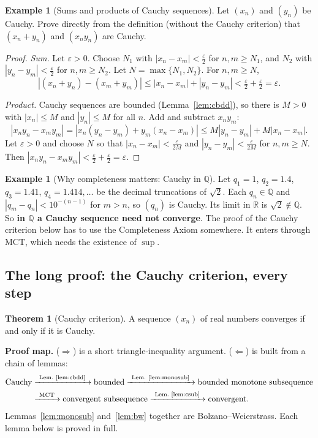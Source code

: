 \documentclass[11pt]{article}
\theoremstyle{definition}
\newtheorem{thm}[defn]{Theorem}
\newtheorem{ex}[defn]{Example}
\newcommand{\Q}{\mathbb{Q}}
\newcommand{\R}{\mathbb{R}}
\newcommand{\eps}{\varepsilon}
\newcommand{\key}[1]{\textcolor{red!70!black}{\textbf{#1}}}
\begin{document}
\begin{ex}[Sums and products of Cauchy sequences]\label{ex:sumprod}
Let $(x_n)$ and $(y_n)$ be Cauchy. Prove directly from the definition
(without the Cauchy criterion) that $(x_n+y_n)$ and $(x_ny_n)$ are Cauchy.

\begin{proof}
\emph{Sum.} Let $\eps>0$. Choose $N_1$ with $|x_n-x_m|<\frac\eps2$ for
$n,m\ge N_1$, and $N_2$ with $|y_n-y_m|<\frac\eps2$ for $n,m\ge N_2$. Let
$N=\max\{N_1,N_2\}$. For $n,m\ge N$,
\[
|(x_n+y_n)-(x_m+y_m)|\le|x_n-x_m|+|y_n-y_m|<\tfrac\eps2+\tfrac\eps2=\eps.
\]

\emph{Product.} Cauchy sequences are bounded (Lemma~\ref{lem:cbdd}), so
there is $M>0$ with $|x_n|\le M$ and $|y_n|\le M$ for all $n$. Add and
subtract $x_ny_m$:
\[
|x_ny_n-x_my_m|=|x_n(y_n-y_m)+y_m(x_n-x_m)|\le M|y_n-y_m|+M|x_n-x_m|.
\]
Let $\eps>0$ and choose $N$ so that $|x_n-x_m|<\frac\eps{2M}$ and
$|y_n-y_m|<\frac\eps{2M}$ for $n,m\ge N$. Then
$|x_ny_n-x_my_m|<\frac\eps2+\frac\eps2=\eps$.
\end{proof}
\end{ex}

\begin{ex}[Why completeness matters: Cauchy in $\Q$]
Let $q_1=1$, $q_2=1.4$, $q_3=1.41$, $q_4=1.414,\dots$ be the decimal
truncations of $\sqrt2$. Each $q_n\in\Q$ and $|q_m-q_n|<10^{-(n-1)}$ for
$m>n$, so $(q_n)$ is Cauchy. Its limit in $\R$ is $\sqrt2\notin\Q$. So
\textbf{in $\Q$ a Cauchy sequence need not converge}. The proof of the
Cauchy criterion below has to use the Completeness Axiom somewhere. It
enters through MCT, which needs the existence of $\sup$.
\end{ex}

\subsection{The long proof: the Cauchy criterion, every step}

\begin{thm}[Cauchy criterion]\label{thm:cauchy}
A sequence $(x_n)$ of real numbers converges if and only if it is Cauchy.
\end{thm}

\noindent\key{Proof map.} ($\Rightarrow$) is a short triangle-inequality
argument. ($\Leftarrow$) is built from a chain of lemmas:
\begin{align*}
\text{Cauchy}
&\xrightarrow{\ \text{Lem.~\ref{lem:cbdd}}\ }\text{bounded}
\xrightarrow{\ \text{Lem.~\ref{lem:monosub}}\ }\text{bounded monotone subsequence}\\
&\xrightarrow{\ \text{MCT}\ }\text{convergent subsequence}
\xrightarrow{\ \text{Lem.~\ref{lem:csub}}\ }\text{convergent}.
\end{align*}
Lemmas~\ref{lem:monosub} and~\ref{lem:bw} together are
Bolzano--Weierstrass. Each lemma below is proved in full.
\end{document}
